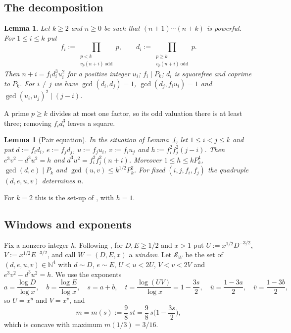 \documentclass[11pt,reqno]{amsart}
\newtheorem{lemma}[theorem]{Lemma}
\theoremstyle{definition}
\theoremstyle{remark}
\numberwithin{equation}{section}
\newcommand{\N}{\mathbb N}
\newcommand{\ub}{\bar u}
\newcommand{\vb}{\bar v}
\begin{document}
\subsection{The decomposition}
\begin{lemma}\label{lem:decomp}
Let $k\ge2$ and $n\ge0$ be such that $(n+1)\cdots(n+k)$ is powerful. For
$1\le i\le k$ put
\[
f_i:=\prod_{\substack{p<k\\ v_p(n+i)\ \mathrm{odd}}}p,\qquad
d_i:=\prod_{\substack{p\ge k\\ v_p(n+i)\ \mathrm{odd}}}p .
\]
Then $n+i=f_id_i^3u_i^2$ for a positive integer $u_i$; $f_i\mid P_k$; $d_i$ is
squarefree and coprime to $P_k$. For $i\ne j$ we have $\gcd(d_i,d_j)=1$,
$\gcd(d_j,f_iu_i)=1$ and $\gcd(u_i,u_j)^2\mid (j-i)$.
\end{lemma}

A prime $p\ge k$ divides at most one factor, so its odd valuation there is at
least three; removing $f_id_i^3$ leaves a square.

\begin{lemma}[Pair equation]\label{lem:pair}
In the situation of Lemma~\ref{lem:decomp}, let $1\le i<j\le k$ and put
$d:=f_id_i$, $e:=f_jd_j$, $u:=f_ju_i$, $v:=f_iu_j$ and $h:=f_i^2f_j^2(j-i)$.
Then $e^3v^2-d^3u^2=h$ and $d^3u^2=f_i^2f_j^2(n+i)$. Moreover
$1\le h\le kP_k^4$, $\gcd(d,e)\mid P_k$ and $\gcd(u,v)\le k^{1/2}P_k^2$. For
fixed $(i,j,f_i,f_j)$ the quadruple $(d,e,u,v)$ determines $n$.
\end{lemma}
For $k=2$ this is the set-up of \cite[\S5]{Reuss}, with $h=1$.

\subsection{Windows and exponents}
Fix a nonzero integer $h$. Following \cite[Theorem~1]{Reuss}, for
$D,E\ge1/2$ and $x>1$ put $U:=x^{1/2}D^{-3/2}$, $V:=x^{1/2}E^{-3/2}$,
and call $W=(D,E,x)$ a \emph{window}. Let $\mathcal S_W$ be the set of
$(d,e,u,v)\in\N^4$ with $d\sim D$, $e\sim E$, $U<u<2U$, $V<v<2V$ and
$e^3v^2-d^3u^2=h$. We use the exponents
\begin{equation}\label{eq:exponents}
a=\frac{\log D}{\log x},\quad b=\frac{\log E}{\log x},\quad s=a+b,\quad
t=\frac{\log (UV)}{\log x}=1-\frac{3s}2,\quad
\ub=\frac{1-3a}2,\quad \vb=\frac{1-3b}2,
\end{equation}
so $U=x^{\ub}$ and $V=x^{\vb}$, and
\begin{equation}\label{eq:m}
m=m(s):=\frac98\,st=\frac98\,s\Big(1-\frac{3s}{2}\Big),
\end{equation}
which is concave with maximum $m(1/3)=3/16$.
\end{document}
